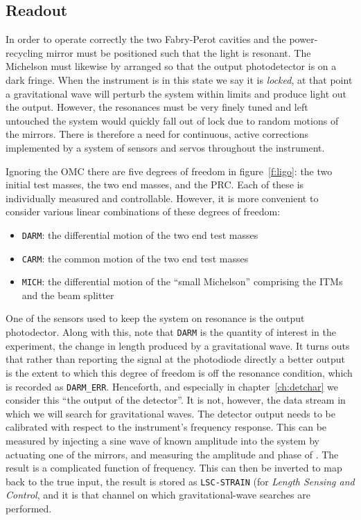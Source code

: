 \subsection{Readout}
\label{ssec:readout}

In order to operate correctly the two Fabry-Perot cavities and the
power-recycling mirror must be positioned such that the light is
resonant.  The Michelson must likewise by arranged so that the output
photodetector is on a dark fringe.  When the instrument is in this
state we say it is \emph{locked}, at that point a gravitational wave
will perturb the system within limits and produce light out the
output.  However, the resonances must be very finely tuned and left
untouched the system would quickly fall out of lock due to random
motions of the mirrors.  There is therefore a need for continuous,
active corrections implemented by a system of sensors and servos
throughout the instrument.

Ignoring the OMC there are five degrees of freedom in
figure~\ref{f:ligo}: the two initial test masses, the two end masses,
and the PRC.  Each of these is individually measured and controllable.
However, it is more convenient to consider various linear combinations
of these degrees of freedom:

\begin{itemize}
\item \texttt{DARM}: the differential motion of the two end test masses
\item \texttt{CARM}: the common motion of the two end test masses
\item \texttt{MICH}: the differential motion of the ``small Michelson'' comprising
the ITMs and the beam splitter
\end{itemize}

One of the sensors used to keep the system on resonance is the output
photodector.  Along with this, note that \texttt{DARM} is the quantity
of interest in the experiment, the change in length produced by a
gravitational wave.    It turns outs that rather than reporting the
signal at the photodiode directly a better output is the extent to
which this degree of freedom is off the resonance condition, which is
recorded as \texttt{DARM\_ERR}.  Henceforth, and especially in
chapter~\ref{ch:detchar} we consider this ``the output of the
detector''.  It is not, however, the data stream in which we will
search for gravitational waves.  The detector output needs to be
calibrated with respect to the instrument's frequency response.  This
can be measured by injecting a sine wave of known amplitude into the
system by actuating one of the mirrors, and measuring the amplitude
and phase of \darmerr.  The result is a complicated function of
frequency.  This can then be inverted to map \darmerr back to the true
input, the result is stored as \texttt{LSC-STRAIN} (for \emph{Length
Sensing and Control}, and it is that channel on which
gravitational-wave searches are performed.

